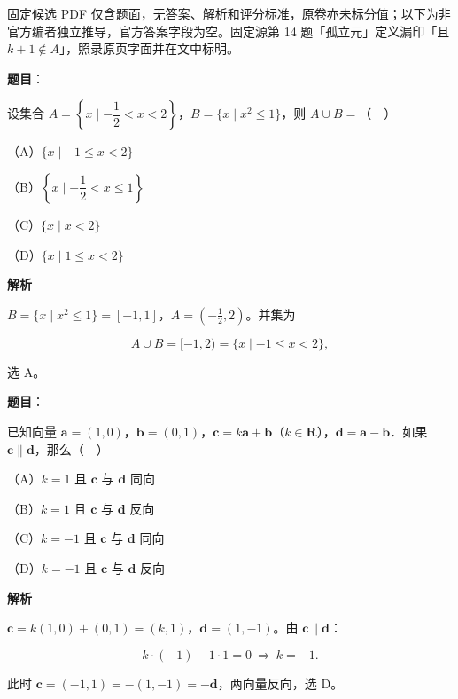 

\begin{gktip}
固定候选 PDF 仅含题面，无答案、解析和评分标准，原卷亦未标分值；以下为非官方编者独立推导，官方答案字段为空。固定源第 14 题「孤立元」定义漏印「且 $k+1\notin A$」，照录原页字面并在文中标明。
\end{gktip}

\begin{answer}

\textbf{题目}：

设集合 $A=\left\{x\mid-\dfrac12<x<2\right\}$，$B=\{x\mid x^2\leqslant1\}$，则 $A\cup B=$（　）

（A）$\{x\mid-1\leqslant x<2\}$

（B）$\left\{x\mid-\dfrac12<x\leqslant1\right\}$

（C）$\{x\mid x<2\}$

（D）$\{x\mid1\leqslant x<2\}$

\textbf{解析}

$B=\{x\mid x^2\leqslant1\}=[-1,1]$，$A=\left(-\frac12,2\right)$。并集为

\nopagebreak[4]
\[A\cup B=[-1,2)=\{x\mid-1\leqslant x<2\},\]

选 A。


\end{answer}
\begin{answer}

\textbf{题目}：

已知向量 $\boldsymbol a=(1,0)$，$\boldsymbol b=(0,1)$，$\boldsymbol c=k\boldsymbol a+\boldsymbol b$（$k\in\mathbf R$），$\boldsymbol d=\boldsymbol a-\boldsymbol b$．如果 $\boldsymbol c\parallel\boldsymbol d$，那么（　）

（A）$k=1$ 且 $\boldsymbol c$ 与 $\boldsymbol d$ 同向

（B）$k=1$ 且 $\boldsymbol c$ 与 $\boldsymbol d$ 反向

（C）$k=-1$ 且 $\boldsymbol c$ 与 $\boldsymbol d$ 同向

（D）$k=-1$ 且 $\boldsymbol c$ 与 $\boldsymbol d$ 反向

\textbf{解析}

$\boldsymbol c=k(1,0)+(0,1)=(k,1)$，$\boldsymbol d=(1,-1)$。由 $\boldsymbol c\parallel\boldsymbol d$：

\nopagebreak[4]
\[k\cdot(-1)-1\cdot1=0\ \Longrightarrow\ k=-1 .\]

此时 $\boldsymbol c=(-1,1)=-(1,-1)=-\boldsymbol d$，两向量反向，选 D。


\end{answer}
